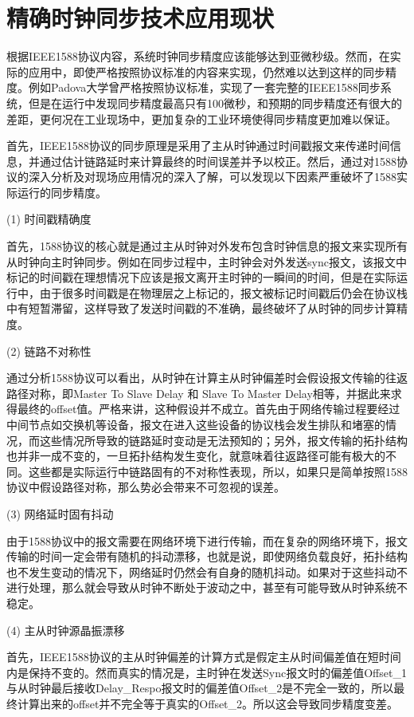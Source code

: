 \section{精确时钟同步技术应用现状}
根据IEEE1588协议内容，系统时钟同步精度应该能够达到亚微秒级\supercite{2}。然而，在实际的应用中，即使严格按照协议标准的内容来实现，仍然难以达到这样的同步精度。例如Padova大学曾严格按照协议标准，实现了一套完整的IEEE1588同步系统\supercite{3}，但是在运行中发现同步精度最高只有100微秒，和预期的同步精度还有很大的差距，更何况在工业现场中，更加复杂的工业环境使得同步精度更加难以保证。

首先，IEEE1588协议的同步原理是采用了主从时钟通过时间戳报文来传递时间信息，并通过估计链路延时来计算最终的时间误差并予以校正。然后，通过对1588协议的深入分析及对现场应用情况的深入了解，可以发现以下因素严重破坏了1588实际运行的同步精度。

(1) 时间戳精确度

首先，1588协议的核心就是通过主从时钟对外发布包含时钟信息的报文来实现所有从时钟向主时钟同步。例如在同步过程中，主时钟会对外发送sync报文，该报文中标记的时间戳在理想情况下应该是报文离开主时钟的一瞬间的时间，但是在实际运行中，由于很多时间戳是在物理层之上标记的，报文被标记时间戳后仍会在协议栈中有短暂滞留，这样导致了发送时间戳的不准确，最终破坏了从时钟的同步计算精度。

(2) 链路不对称性

通过分析1588协议可以看出，从时钟在计算主从时钟偏差时会假设报文传输的往返路径对称，即Master To Slave Delay 和 Slave To Master Delay相等，并据此来求得最终的offset值。严格来讲，这种假设并不成立。首先由于网络传输过程要经过中间节点如交换机等设备，报文在进入这些设备的协议栈会发生排队和堵塞的情况，而这些情况所导致的链路延时变动是无法预知的；另外，报文传输的拓扑结构也并非一成不变的，一旦拓扑结构发生变化，就意味着往返路径可能有极大的不同。这些都是实际运行中链路固有的不对称性表现，所以，如果只是简单按照1588协议中假设路径对称，那么势必会带来不可忽视的误差。

(3) 网络延时固有抖动

由于1588协议中的报文需要在网络环境下进行传输，而在复杂的网络环境下，报文传输的时间一定会带有随机的抖动漂移，也就是说，即使网络负载良好，拓扑结构也不发生变动的情况下，网络延时仍然会有自身的随机抖动。如果对于这些抖动不进行处理，那么就会导致从时钟不断处于波动之中，甚至有可能导致从时钟系统不稳定。

(4) 主从时钟源晶振漂移

首先，IEEE1588协议的主从时钟偏差的计算方式是假定主从时间偏差值在短时间内是保持不变的。然而真实的情况是，主时钟在发送Sync报文时的偏差值Offset\_1与从时钟最后接收Delay\_Respo报文时的偏差值Offset\_2是不完全一致的，所以最终计算出来的offset并不完全等于真实的Offset\_2。所以这会导致同步精度变差。

